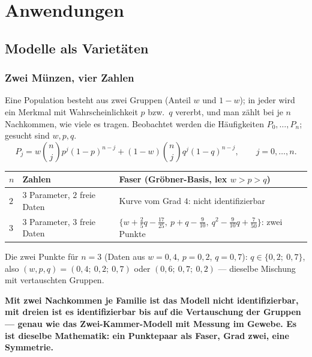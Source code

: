 \part{Anwendungen}

\chapter{Modelle als Varietäten}

\section{Zwei Münzen, vier Zahlen}

\begin{merksatz}
Eine Population besteht aus zwei Gruppen (Anteil $w$ und $1 - w$); in jeder wird ein Merkmal mit Wahrscheinlichkeit $p$ bzw.\ $q$ vererbt, und man zählt bei je $n$ Nachkommen, wie viele es tragen. Beobachtet werden die Häufigkeiten $P_0, \ldots, P_n$; gesucht sind $w, p, q$.
\[ P_j = w\binom nj p^{j}(1 - p)^{n-j} + (1 - w)\binom nj q^{j}(1 - q)^{n-j}, \qquad j = 0, \ldots, n . \]

\begin{center}
{\small
\renewcommand{\arraystretch}{1.5}
\begin{tabular}{@{}P{1.0cm}P{2.6cm}P{5.0cm}@{}}
\toprule
$n$ & \textbf{Zahlen} & \textbf{Faser (Gröbner-Basis, lex $w > p > q$)}\\
\midrule
$2$ & $3$ Parameter, $2$ freie Daten & Kurve vom Grad $4$: nicht identifizierbar\\
$3$ & $3$ Parameter, $3$ freie Daten & $\{w + \tfrac25q - \tfrac{17}{25},\ p + q - \tfrac{9}{10},\ q^{2} - \tfrac{9}{10}q + \tfrac{7}{50}\}$: zwei Punkte\\
\bottomrule
\end{tabular}}
\end{center}
Die zwei Punkte für $n = 3$ (Daten aus $w = 0{,}4$, $p = 0{,}2$, $q = 0{,}7$): $q\in\{0{,}2;\ 0{,}7\}$, also $(w, p, q) = (0{,}4;\ 0{,}2;\ 0{,}7)$ oder $(0{,}6;\ 0{,}7;\ 0{,}2)$ --- dieselbe Mischung mit vertauschten Gruppen.

\begin{center}
\begin{minipage}{0.9\textwidth}
\textbf{Mit zwei Nachkommen je Familie ist das Modell nicht identifizierbar, mit dreien ist es identifizierbar bis auf die Vertauschung der Gruppen --- genau wie das Zwei-Kammer-Modell mit Messung im Gewebe. Es ist dieselbe Mathematik: ein Punktepaar als Faser, Grad zwei, eine Symmetrie.}
\end{minipage}
\end{center}


\end{merksatz}
